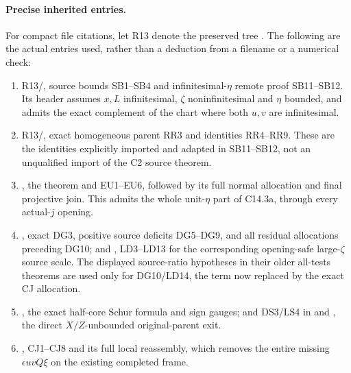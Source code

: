 \paragraph{Precise inherited entries.}
For compact file citations, let R13 denote the preserved tree
.
The following are the actual entries used, rather than a deduction
from a filename or a numerical check:
\begin{enumerate}
\item R13/,
      source bounds SB1--SB4 and infinitesimal-$\eta$ remote proof
      SB11--SB12.  Its header assumes $x,L$ infinitesimal,
      $\zeta$ noninfinitesimal and $\eta$ bounded, and admits the
      exact complement of the chart where both $u,v$ are infinitesimal.
\item R13/,
      exact homogeneous parent RR3 and identities RR4--RR9.
      These are the identities explicitly imported and adapted in
      SB11--SB12, not an unqualified import of the C2 source theorem.
\item {},
      the theorem and EU1--EU6, followed by its full normal allocation
      and final projective join.  This admits the whole unit-$\eta$
      part of C14.3a, through every actual-$j$ opening.
\item {},
      exact DG3, positive source deficits DG5--DG9, and all residual
      allocations preceding DG10; and
      ,
      LD3--LD13 for the corresponding opening-safe large-$\zeta$
      source scale.  The displayed source-ratio hypotheses in their
      older all-tests theorems are used only for DG10/LD14, the term
      now replaced by the exact CJ allocation.
\item {}, the exact half-core
      Schur formula and sign gauges; and DS3/LS4 in
       and
      ,
      the direct $X/Z$-unbounded original-parent exit.
\item {}, CJ1--CJ8
      and its full local reassembly, which removes the entire
      missing $\epsilon uvQ\xi$ on the existing completed frame.
\end{enumerate}

